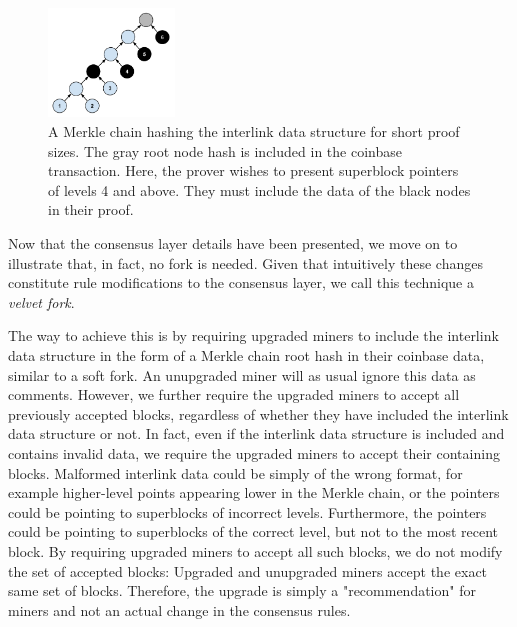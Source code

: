 \begin{figure}[h]
    \caption{\label{fig.merkle_chain}
    A Merkle chain hashing the interlink data structure for short
    proof sizes. The gray root node hash is included in the coinbase
    transaction. Here, the prover wishes to present superblock pointers of
    levels 4 and above. They must include the data of the black nodes in their
    proof.}
    \centering
    \includegraphics[width=0.3\textwidth,keepaspectratio]{figures/merkle-chain.png}
\end{figure}

Now that the consensus layer details have been presented, we move on to
illustrate that, in fact, no fork is needed. Given that intuitively these
changes constitute rule modifications to the consensus layer, we call this
technique a \textit{velvet fork}.

The way to achieve this is by requiring upgraded miners to include the
interlink data structure in the form of a Merkle chain root hash in their
coinbase data, similar to a soft fork. An unupgraded miner will as usual ignore
this data as comments. However, we further require the upgraded miners to
accept all previously accepted blocks, regardless of whether they have included
the interlink data structure or not. In fact, even if the interlink data
structure is included and contains invalid data, we require the upgraded miners
to accept their containing blocks. Malformed interlink data could be simply of
the wrong format, for example higher-level points appearing lower in the Merkle
chain, or the pointers could be pointing to superblocks of incorrect
levels. Furthermore, the pointers could be pointing to superblocks of the
correct level, but not to the most recent block. By requiring upgraded miners
to accept all such blocks, we do not modify the set of accepted blocks:
Upgraded and unupgraded miners accept the exact same set of blocks. Therefore,
the upgrade is simply a "recommendation" for miners and not an actual change in
the consensus rules.

